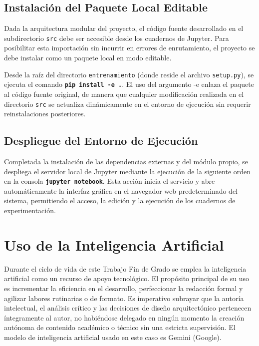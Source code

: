 \section*{Instalación del Paquete Local Editable}
Dada la arquitectura modular del proyecto, el código fuente desarrollado en el subdirectorio \texttt{src} debe ser accesible desde los cuadernos de Jupyter. Para posibilitar esta importación sin incurrir en errores de enrutamiento, el proyecto se debe instalar como un paquete local en modo editable.

Desde la raíz del directorio \texttt{entrenamiento} (donde reside el archivo \texttt{setup.py}), se ejecuta el comando\textbf{ \texttt{pip install -e .}}. El uso del argumento -e enlaza el paquete al código fuente original, de manera que cualquier modificación realizada en el directorio \texttt{src} se actualiza dinámicamente en el entorno de ejecución sin requerir reinstalaciones posteriores.

\section*{Despliegue del Entorno de Ejecución}
Completada la instalación de las dependencias externas y del módulo propio, se despliega el servidor local de Jupyter mediante la ejecución de la siguiente orden en la consola \textbf{\texttt{jupyter notebook}}. Esta acción inicia el servicio y abre automáticamente la interfaz gráfica en el navegador web predeterminado del sistema, permitiendo el acceso, la edición y la ejecución de los cuadernos de experimentación.

\chapter{Uso de la Inteligencia Artificial}
Durante el ciclo de vida de este Trabajo Fin de Grado se emplea la inteligencia artificial como un recurso de apoyo tecnológico. El propósito principal de su uso es incrementar la eficiencia en el desarrollo, perfeccionar la redacción formal y agilizar labores rutinarias o de formato. Es imperativo subrayar que la autoría intelectual, el análisis crítico y las decisiones de diseño arquitectónico pertenecen íntegramente al autor, no habiéndose delegado en ningún momento la creación autónoma de contenido académico o técnico sin una estricta supervisión. El modelo de inteligencia artificial usado en este caso es Gemini (Google).

